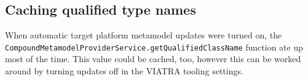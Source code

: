 \documentclass[11pt,a4paper,oneside]{report}
\begin{document}
\subsection{Caching qualified type names}
When automatic target platform metamodel updates were turned on, the
\texttt{CompoundMetamodelProviderService.getQualifiedClassName} function ate up
most of the time. This value could be cached, too, however this can be worked
around by turning updates off in the VIATRA tooling settings.


\listoffigures{}
\listoftables{}

\label{page:last}
\end{document}
